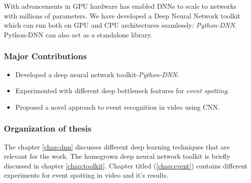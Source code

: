 With advancements in GPU hardware has enabled DNNs to scale to networks with millions of parameters.  We have developed a Deep Neural Network toolkit which can run both on GPU and CPU architectures seamlessly: \textit{Python-DNN}.  Python-DNN can also act as a standalone library.

\subsubsection{Major Contributions}
\begin{itemize}
\item Developed a deep neural network toolkit-\textit{Python-DNN}. 
\item Experimented with different deep bottleneck features for \textit{event spotting}.
\item Proposed a novel approach to event recognition in video using CNN.
\end{itemize}

\subsubsection{Organization of thesis}
The chapter \ref{chap:dnn} discusses different deep learning techniques that are relevant for the work.  The homegrown deep neural network toolkit is briefly discussed in chapter \ref{chap:toolkit}.  Chapter titled  (\ref{chap:event}) contains different experiments for event spotting in video and it's results.
